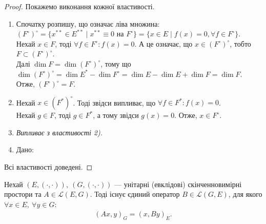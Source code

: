 \documentclass{math_library}
\begin{document}
\begin{proof}
Покажемо виконання кожної властивості.
\begin{enumerate}[topsep=-\parskip, wide=0pt, label={\arabic*)}]
\item Спочатку розпишу, що означає ліва множина:\\
$(F^\circ)^\circ = \{ x^{**} \in E^{**} \mid x^{**} \equiv 0 \text{ на } F^\circ \} = \{x \in E \mid f(x) = 0, \forall f \in F^\circ\}$.\\
Нехай $x \in F$, тоді $\forall f \in F^\circ : f(x) = 0$. А це означає, що $x \in (F^\circ)^\circ$, тобто $F \subset (F^\circ)^\circ$.\\
Далі $\dim F = \dim (F^\circ)^\circ$, тому що $\dim (F^{\circ})^\circ = \dim E^* - \dim F^\circ = \dim E - \dim E + \dim F = \dim F$.\\
Отже, $(F^{\circ})^{\circ} = F$.
\item Нехай $x \in (F^*)^\circ$. Тоді звідси випливає, що $\forall f \in F^*: f(x) = 0$.\\
Нехай $g \in F$, тоді $g \in F^*$, а тому звідси $g(x) = 0$. Отже, $x \in F^\circ$.
\item \textit{Випливає з властивості 2).}
\item Дано:
\end{enumerate}
Всі властивості доведені.
\end{proof}
\fi

\begin{theorem} Нехай $(E,(\cdot,\cdot)),\ (G,(\cdot,\cdot))$ --- унітарні (евклідові) скінченновимірні простори та $A \in \mathcal{L}(E,G)$. Тоді існує єдиний оператор $B \in \mathcal{L}(G,E)$, для якого $\forall x \in E,\ \forall y \in G:$
\begin{align*}
(Ax,y)_G = (x,By)_E.
\end{align*}
\end{theorem}
\end{document}
